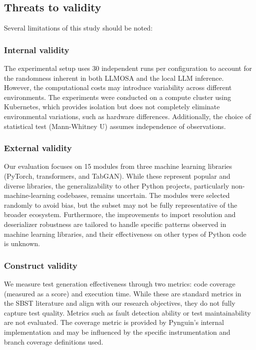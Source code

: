 \documentclass{article}
\begin{document}
\subsection{Threats to validity}

Several limitations of this study should be noted:
\subsubsection{Internal validity}
The experimental setup uses 30 independent runs per configuration to account for the randomness inherent in both LLMOSA and the local LLM inference. However, the computational costs may introduce variability across different environments. The experiments were conducted on a compute cluster using Kubernetes, which provides isolation but does not completely eliminate environmental variations, such as hardware differences. Additionally, the choice of statistical test (Mann-Whitney U) assumes independence of observations.

\subsubsection{External validity}
Our evaluation focuses on 15 modules from three machine learning libraries (PyTorch, transformers, and TabGAN). While these represent popular and diverse libraries, the generalizability to other Python projects, particularly non-machine-learning codebases, remains uncertain. The modules were selected randomly to avoid bias, but the subset may not be fully representative of the broader ecosystem. Furthermore, the improvements to import resolution and deserializer robustness are tailored to handle specific patterns observed in machine learning libraries, and their effectiveness on other types of Python code is unknown.

\subsubsection{Construct validity}
We measure test generation effectiveness through two metrics: code coverage (measured as a score) and execution time. While these are standard metrics in the SBST literature and align with our research objectives, they do not fully capture test quality. Metrics such as fault detection ability or test maintainability are not evaluated. The coverage metric is provided by Pynguin's internal implementation and may be influenced by the specific instrumentation and branch coverage definitions used.
\end{document}
